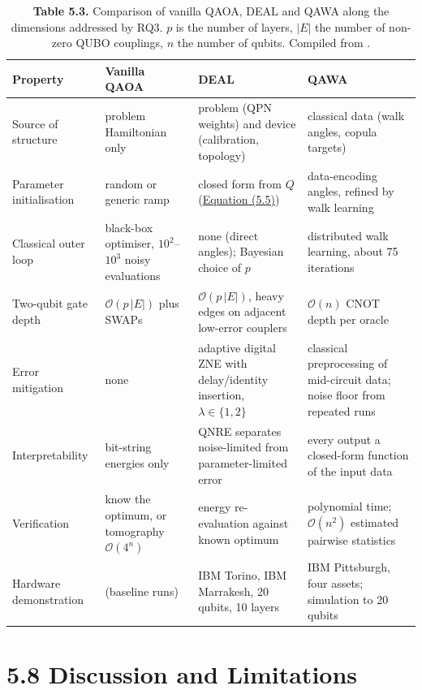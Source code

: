 \documentclass{report}
\theoremstyle{plain}
\theoremstyle{definition}
\theoremstyle{remark}
\newcommand{\bigO}[1]{\mathcal{O}\!\left(#1\right)}
\begin{document}
\begin{table}[htbp]
\caption{\textbf{Table 5.3.} Comparison of vanilla QAOA, DEAL and QAWA along the dimensions addressed by RQ3. $p$ is the number of layers, $|E|$ the number of non-zero QUBO couplings, $n$ the number of qubits. Compiled from \cite{farhi2014qaoa,guo2025deal,guo2025qawa}.}
\label{tab:nisq:compare}
 \small
\begin{tabular}{llll}
\toprule
Property & Vanilla QAOA & DEAL & QAWA \\
\midrule
Source of structure & problem Hamiltonian only & problem (QPN weights) and device (calibration, topology) & classical data (walk angles, copula targets) \\
Parameter initialisation & random or generic ramp & closed form from $Q$ (\hyperref[eq:nisq:init]{Equation (5.5)}) & data-encoding angles, refined by walk learning \\
Classical outer loop & black-box optimiser, $10^{2}$--$10^{3}$ noisy evaluations & none (direct angles); Bayesian choice of $p$ & distributed walk learning, about 75 iterations \\
Two-qubit gate depth & $\bigO{p\,|E|}$ plus SWAPs & $\bigO{p\,|E|}$, heavy edges on adjacent low-error couplers & $\bigO{n}$ CNOT depth per oracle \\
Error mitigation & none & adaptive digital ZNE with delay/identity insertion, $\lambda\in\{1,2\}$ & classical preprocessing of mid-circuit data; noise floor from repeated runs \\
Interpretability & bit-string energies only & QNRE separates noise-limited from parameter-limited error & every output a closed-form function of the input data \\
Verification & know the optimum, or tomography $\bigO{4^{n}}$ & energy re-evaluation against known optimum & polynomial time; $\bigO{n^{2}}$ estimated pairwise statistics \\
Hardware demonstration & (baseline runs) & IBM Torino, IBM Marrakesh, 20 qubits, 10 layers & IBM Pittsburgh, four assets; simulation to 20 qubits \\
\bottomrule
\end{tabular}
\end{table}

\section{5.8 Discussion and Limitations}\label{sec:nisq:discussion}
\end{document}
